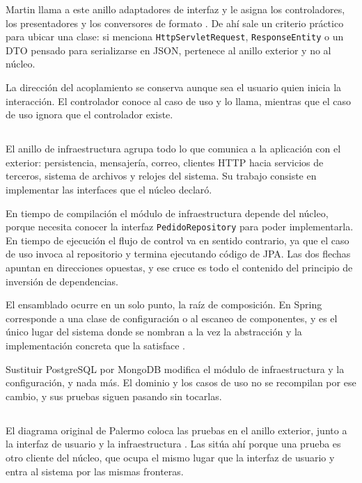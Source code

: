 \documentclass[10pt,a4paper]{article}
\begin{document}
Martin llama a este anillo adaptadores de interfaz y le asigna los controladores, los presentadores y los conversores de formato \cite{martin2012}. De ahí sale un criterio práctico para ubicar una clase: si menciona \texttt{HttpServletRequest}, \texttt{ResponseEntity} o un DTO pensado para serializarse en JSON, pertenece al anillo exterior y no al núcleo.

La dirección del acoplamiento se conserva aunque sea el usuario quien inicia la interacción. El controlador conoce al caso de uso y lo llama, mientras que el caso de uso ignora que el controlador existe.

\subsection{ \color{colorESCOM}{Infraestructura}}

El anillo de infraestructura agrupa todo lo que comunica a la aplicación con el exterior: persistencia, mensajería, correo, clientes HTTP hacia servicios de terceros, sistema de archivos y relojes del sistema. Su trabajo consiste en implementar las interfaces que el núcleo declaró.

En tiempo de compilación el módulo de infraestructura depende del núcleo, porque necesita conocer la interfaz \texttt{PedidoRepository} para poder implementarla. En tiempo de ejecución el flujo de control va en sentido contrario, ya que el caso de uso invoca al repositorio y termina ejecutando código de JPA. Las dos flechas apuntan en direcciones opuestas, y ese cruce es todo el contenido del principio de inversión de dependencias.

El ensamblado ocurre en un solo punto, la raíz de composición. En Spring corresponde a una clase de configuración o al escaneo de componentes, y es el único lugar del sistema donde se nombran a la vez la abstracción y la implementación concreta que la satisface \cite{foojay2023}.

Sustituir PostgreSQL por MongoDB modifica el módulo de infraestructura y la configuración, y nada más. El dominio y los casos de uso no se recompilan por ese cambio, y sus pruebas siguen pasando sin tocarlas.

\subsection{ \color{colorESCOM}{Pruebas}}

El diagrama original de Palermo coloca las pruebas en el anillo exterior, junto a la interfaz de usuario y la infraestructura \cite{palermo2008}. Las sitúa ahí porque una prueba es otro cliente del núcleo, que ocupa el mismo lugar que la interfaz de usuario y entra al sistema por las mismas fronteras.
\end{document}
